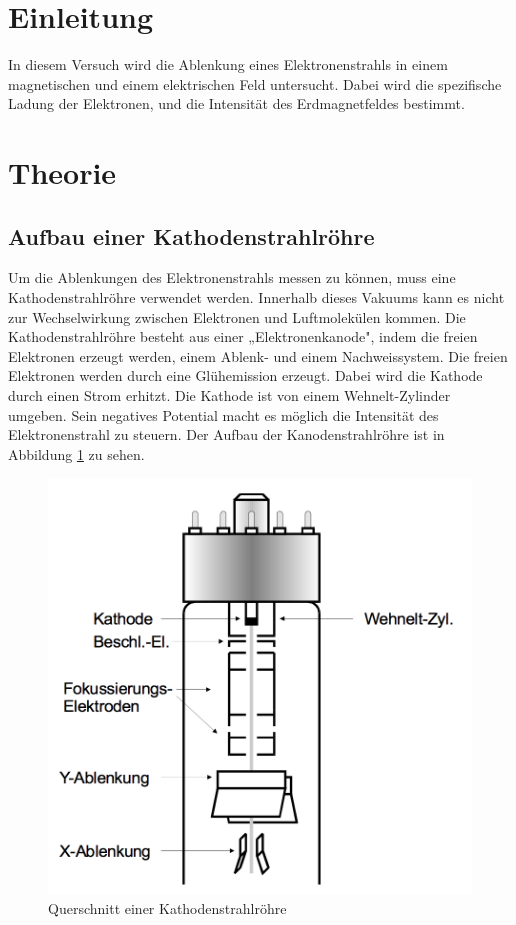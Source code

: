 
\section{Einleitung}
In diesem Versuch wird die Ablenkung eines Elektronenstrahls in einem magnetischen und
einem elektrischen Feld untersucht. Dabei wird die spezifische Ladung der Elektronen,
und die Intensität des Erdmagnetfeldes bestimmt.
\section{Theorie}
\subsection{Aufbau einer Kathodenstrahlröhre}
Um die Ablenkungen des Elektronenstrahls messen zu können, muss eine Kathodenstrahlröhre
verwendet werden. Innerhalb dieses Vakuums kann es nicht zur Wechselwirkung zwischen
Elektronen und Luftmolekülen kommen. Die Kathodenstrahlröhre besteht aus einer
„Elektronenkanode", indem die freien Elektronen erzeugt werden, einem Ablenk- und einem
Nachweissystem.
\newline
Die freien Elektronen werden durch eine Glühemission erzeugt.
Dabei wird die Kathode durch einen Strom erhitzt.
Die Kathode ist von einem Wehnelt-Zylinder umgeben.
Sein negatives Potential macht es möglich die Intensität des Elektronenstrahl zu
steuern.
\newline
Der Aufbau der Kanodenstrahlröhre ist in Abbildung \ref{fig:aufbau} zu sehen.
\begin{figure}
 \centering
  \includegraphics[scale=0.5]{aufbau.png}
  \caption{Querschnitt einer Kathodenstrahlröhre\cite{Anleitung}}
  \label{fig:aufbau}
\end{figure}
\newpage
